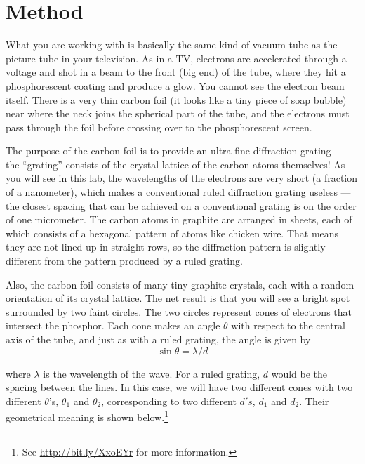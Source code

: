 \section*{Method}

What you are working with is basically the same kind of
vacuum tube as the picture tube in your television. As in a
TV, electrons are accelerated through a voltage and shot in
a beam to the front (big end) of the tube, where they hit a
phosphorescent coating and produce a glow. You cannot see
the electron beam itself. There is a very thin carbon foil
(it looks like a tiny piece of soap bubble) near where the
neck joins the spherical part of the tube, and the electrons
must pass through the foil before crossing over to the
phosphorescent screen.

The purpose of the carbon foil is to provide an ultra-fine
diffraction grating --- the ``grating'' consists of the
crystal lattice of the carbon atoms themselves! As you will
see in this lab, the wavelengths of the electrons are very
short (a fraction of a nanometer), which makes a conventional
ruled diffraction grating useless --- the closest spacing
that can be achieved on a conventional grating is on the
order of one micrometer. The carbon atoms in graphite are
arranged in sheets, each of which consists of a hexagonal
pattern of atoms like chicken wire. That means they are not
lined up in straight rows, so the diffraction pattern is
slightly different from the pattern produced by a ruled grating.

Also, the carbon foil consists of many tiny graphite
crystals, each with a random orientation of its crystal
lattice. The net result is that you will see a bright spot
surrounded by two faint circles. The two circles represent
cones of electrons that intersect the phosphor. Each cone
makes an angle $\theta $ with respect to the central axis of
the tube, and just as with a ruled grating, the angle is given by
\begin{equation*}
         \sin\theta   =  \lambda /d  
\end{equation*}

where $\lambda $ is the wavelength of the wave. For a ruled
grating, $d$ would be the spacing between the lines. In this
case, we will have two different cones with two different
$\theta $'s, $\theta_1$ and $\theta_2$, corresponding to two
different $d's$, $d_1$ and $d_2$. Their geometrical
meaning is shown below.\footnote{See \url{http://bit.ly/XxoEYr} for more information.}


